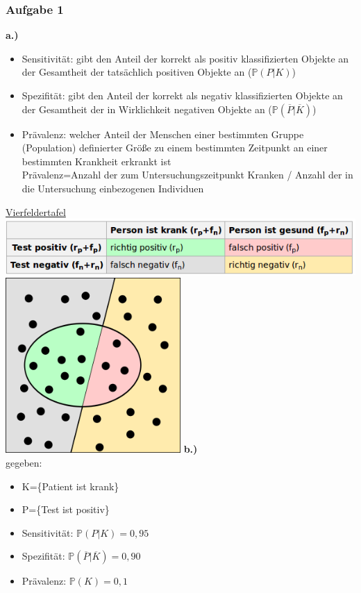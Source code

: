 \subsubsection{Aufgabe 1}
\textbf{a.)}
\begin{itemize}
	\item Sensitivität: gibt den Anteil der korrekt als positiv klassifizierten Objekte an der Gesamtheit der tatsächlich positiven Objekte an ($\mathbb{P}(P|K)$)
	\item Spezifität: gibt den Anteil der korrekt als negativ klassifizierten Objekte an der Gesamtheit der in Wirklichkeit negativen Objekte an ($\mathbb{P}(\overline{P}|\overline{K})$)
	\item Prävalenz: welcher Anteil der Menschen einer bestimmten Gruppe (Population) definierter Größe zu einem bestimmten Zeitpunkt an einer bestimmten Krankheit erkrankt ist\\
	Prävalenz=Anzahl der zum Untersuchungszeitpunkt Kranken / Anzahl der in die Untersuchung einbezogenen Individuen
\end{itemize}

\underline{Vierfeldertafel}\\
\includegraphics[width=1\textwidth]{lectures/V3/pix/Konfusionsmatrix.png}
\includegraphics[width=0.5\textwidth]{lectures/V3/pix/Binary-classification-file.png}
\newpage
\textbf{b.)}\\
gegeben:
\begin{itemize}
	\item K=\{Patient ist krank\}
	\item P=\{Test ist positiv\}
	\item Sensitivität: $\mathbb{P}(P|K)=0,95$
	\item Spezifität: $\mathbb{P}(\overline{P}|\overline{K})=0,90$
	\item Prävalenz: $\mathbb{P}(K)=0,1$
\end{itemize}

